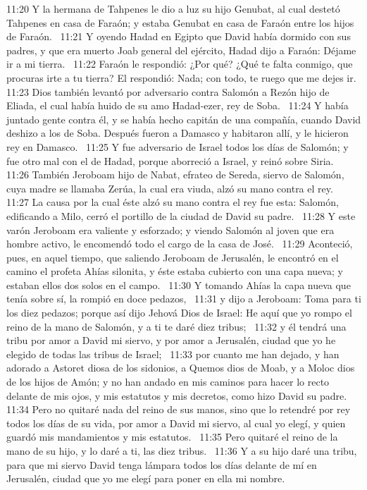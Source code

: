 11:20 Y la hermana de Tahpenes le dio a luz su hijo Genubat, al cual destetó Tahpenes en casa de Faraón; y estaba Genubat en casa de Faraón entre los hijos de Faraón.  
11:21 Y oyendo Hadad en Egipto que David había dormido con sus padres, y que era muerto Joab general del ejército, Hadad dijo a Faraón: Déjame ir a mi tierra.  
11:22 Faraón le respondió: ¿Por qué? ¿Qué te falta conmigo, que procuras irte a tu tierra? El respondió: Nada; con todo, te ruego que me dejes ir.  
11:23 Dios también levantó por adversario contra Salomón a Rezón hijo de Eliada, el cual había huido de su amo Hadad-ezer, rey de Soba.  
11:24 Y había juntado gente contra él, y se había hecho capitán de una compañía, cuando David deshizo a los de Soba. Después fueron a Damasco y habitaron allí, y le hicieron rey en Damasco.  
11:25 Y fue adversario de Israel todos los días de Salomón; y fue otro mal con el de Hadad, porque aborreció a Israel, y reinó sobre Siria.  
11:26 También Jeroboam hijo de Nabat, efrateo de Sereda, siervo de Salomón, cuya madre se llamaba Zerúa, la cual era viuda, alzó su mano contra el rey.  
11:27 La causa por la cual éste alzó su mano contra el rey fue esta: Salomón, edificando a Milo, cerró el portillo de la ciudad de David su padre.  
11:28 Y este varón Jeroboam era valiente y esforzado; y viendo Salomón al joven que era hombre activo, le encomendó todo el cargo de la casa de José.  
11:29 Aconteció, pues, en aquel tiempo, que saliendo Jeroboam de Jerusalén, le encontró en el camino el profeta Ahías silonita, y éste estaba cubierto con una capa nueva; y estaban ellos dos solos en el campo.  
11:30 Y tomando Ahías la capa nueva que tenía sobre sí, la rompió en doce pedazos,  
11:31 y dijo a Jeroboam: Toma para ti los diez pedazos; porque así dijo Jehová Dios de Israel: He aquí que yo rompo el reino de la mano de Salomón, y a ti te daré diez tribus;  
11:32 y él tendrá una tribu por amor a David mi siervo, y por amor a Jerusalén, ciudad que yo he elegido de todas las tribus de Israel;  
11:33 por cuanto me han dejado, y han adorado a Astoret diosa de los sidonios, a Quemos dios de Moab, y a Moloc dios de los hijos de Amón; y no han andado en mis caminos para hacer lo recto delante de mis ojos, y mis estatutos y mis decretos, como hizo David su padre.  
11:34 Pero no quitaré nada del reino de sus manos, sino que lo retendré por rey todos los días de su vida, por amor a David mi siervo, al cual yo elegí, y quien guardó mis mandamientos y mis estatutos.  
11:35 Pero quitaré el reino de la mano de su hijo, y lo daré a ti, las diez tribus.  
11:36 Y a su hijo daré una tribu, para que mi siervo David tenga lámpara todos los días delante de mí en Jerusalén, ciudad que yo me elegí para poner en ella mi nombre.  
